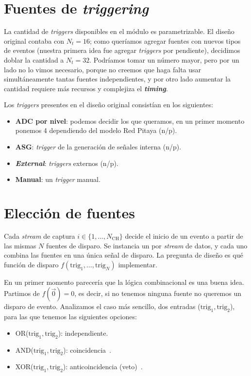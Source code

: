 \section{Fuentes de \emph{triggering}}
\label{S:mt-fuentes}

La cantidad de \emph{triggers} disponibles en el módulo es parametrizable. El
diseño original contaba con $N_t=16$; como queríamos agregar fuentes con nuevos
tipos de eventos (nuestra primera idea fue agregar \emph{triggers} por pendiente), decidimos doblar la
cantidad a $N_t=32$. Podríamos tomar un número mayor, pero por un lado no lo
vimos necesario, porque no creemos que haga falta usar simultáneamente tantas
fuentes independientes, y por otro lado aumentar la cantidad requiere más
recursos y complejiza el \textbf{\emph{timing}}.

Los \emph{triggers} presentes en el diseño original consistían en los siguientes:
\begin{itemize}
  \item \textbf{ADC por nivel}: podemos decidir los que queramos, en un primer
    momento ponemos 4 dependiendo del modelo Red Pitaya (n/p).
  \item \textbf{ASG}: \emph{trigger} de la generación de señales interna (n/p).
  \item \textbf{\emph{External}}: \emph{triggers} externos (n/p).
  \item \textbf{Manual}: un \emph{trigger} manual.
\end{itemize}

\section{Elección de fuentes}
\label{S:mt-eleccion}

Cada \emph{stream} de captura $i \in \{1,\ldots,N_\text{CH}\}$ decide el inicio de un
evento a partir de las mismas $N$ fuentes de disparo. Se instancia un
 por \emph{stream} de datos, y cada uno combina las fuentes en una única
señal de disparo. La pregunta de diseño es qué función de disparo
$f(\text{trig}_1,\ldots,\text{trig}_N)$ implementar.

En un primer momento parecería que la lógica combinacional es una buena idea.
Partimos de $f(\vec 0)=0$, es decir, si no tenemos ninguna fuente no queremos
un disparo de evento. Analizamos el caso más sencillo, dos entradas
($\text{trig}_1, \text{trig}_2$), para las que tenemos las siguientes
opciones:
\begin{itemize}
  \item OR($\text{trig}_1, \text{trig}_2$): independiente.
  \item AND($\text{trig}_1, \text{trig}_2$): coincidencia~\cite{Knoll2010,Rossi1930}.
  \item XOR($\text{trig}_1, \text{trig}_2$): anticoincidencia (veto)~\cite{Leo1994}.
\end{itemize}

